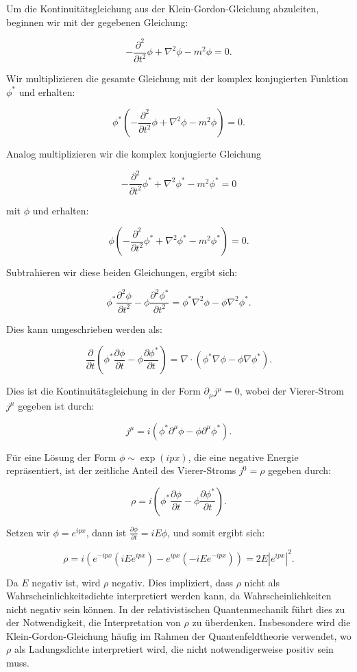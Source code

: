 Um die Kontinuitätsgleichung aus der Klein-Gordon-Gleichung abzuleiten, beginnen wir mit der gegebenen Gleichung:

\[
-\frac{\partial^2}{\partial t^2} \phi + \nabla^2 \phi - m^2 \phi = 0.
\]

Wir multiplizieren die gesamte Gleichung mit der komplex konjugierten Funktion \(\phi^*\) und erhalten:

\[
\phi^* \left(-\frac{\partial^2}{\partial t^2} \phi + \nabla^2 \phi - m^2 \phi \right) = 0.
\]

Analog multiplizieren wir die komplex konjugierte Gleichung

\[
-\frac{\partial^2}{\partial t^2} \phi^* + \nabla^2 \phi^* - m^2 \phi^* = 0
\]

mit \(\phi\) und erhalten:

\[
\phi \left(-\frac{\partial^2}{\partial t^2} \phi^* + \nabla^2 \phi^* - m^2 \phi^* \right) = 0.
\]

Subtrahieren wir diese beiden Gleichungen, ergibt sich:

\[
\phi^* \frac{\partial^2 \phi}{\partial t^2} - \phi \frac{\partial^2 \phi^*}{\partial t^2} = \phi^* \nabla^2 \phi - \phi \nabla^2 \phi^*.
\]

Dies kann umgeschrieben werden als:

\[
\frac{\partial}{\partial t} \left(\phi^* \frac{\partial \phi}{\partial t} - \phi \frac{\partial \phi^*}{\partial t}\right) = \nabla \cdot \left(\phi^* \nabla \phi - \phi \nabla \phi^*\right).
\]

Dies ist die Kontinuitätsgleichung in der Form \(\partial_\mu j^\mu = 0\), wobei der Vierer-Strom \(j^\mu\) gegeben ist durch:

\[
j^\mu = i\left(\phi^* \partial^\mu \phi - \phi \partial^\mu \phi^*\right).
\]

Für eine Lösung der Form \(\phi \sim \exp(i p x)\), die eine negative Energie repräsentiert, ist der zeitliche Anteil des Vierer-Stroms \(j^0 = \rho\) gegeben durch:

\[
\rho = i\left(\phi^* \frac{\partial \phi}{\partial t} - \phi \frac{\partial \phi^*}{\partial t}\right).
\]

Setzen wir \(\phi = e^{i p x}\), dann ist \(\frac{\partial \phi}{\partial t} = i E \phi\), und somit ergibt sich:

\[
\rho = i\left(e^{-i p x} (i E e^{i p x}) - e^{i p x} (-i E e^{-i p x})\right) = 2 E |e^{i p x}|^2.
\]

Da \(E\) negativ ist, wird \(\rho\) negativ. Dies impliziert, dass \(\rho\) nicht als Wahrscheinlichkeitsdichte interpretiert werden kann, da Wahrscheinlichkeiten nicht negativ sein können. In der relativistischen Quantenmechanik führt dies zu der Notwendigkeit, die Interpretation von \(\rho\) zu überdenken. Insbesondere wird die Klein-Gordon-Gleichung häufig im Rahmen der Quantenfeldtheorie verwendet, wo \(\rho\) als Ladungsdichte interpretiert wird, die nicht notwendigerweise positiv sein muss.